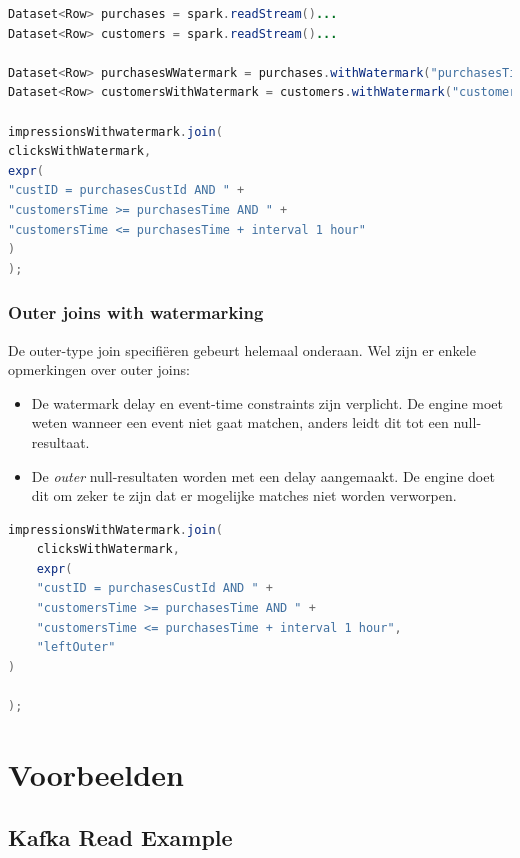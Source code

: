 \documentclass[a4paper,10pt,twoside]{report}
\begin{document}
\begin{lstlisting}[language=Java]
Dataset<Row> purchases = spark.readStream()...
Dataset<Row> customers = spark.readStream()...

Dataset<Row> purchasesWWatermark = purchases.withWatermark("purchasesTime","2 hours");
Dataset<Row> customersWithWatermark = customers.withWatermark("customersTime", "3 hours");

impressionsWithwatermark.join(
clicksWithWatermark,
expr(
"custID = purchasesCustId AND " +
"customersTime >= purchasesTime AND " +
"customersTime <= purchasesTime + interval 1 hour"
)
);
\end{lstlisting}

\subsubsection{Outer joins with watermarking}

De outer-type join specifiëren gebeurt helemaal onderaan. Wel zijn er enkele opmerkingen over outer joins:
\begin{itemize}
\item De watermark delay en event-time constraints zijn verplicht. De engine moet weten wanneer een event niet gaat matchen, anders leidt dit tot een null-resultaat.
\item De \textit{outer} null-resultaten worden met een delay aangemaakt. De engine doet dit om zeker te zijn dat er mogelijke matches niet worden verworpen.
\end{itemize}

\begin{lstlisting}[language=Java]
impressionsWithWatermark.join(
	clicksWithWatermark,
	expr(
	"custID = purchasesCustId AND " +
	"customersTime >= purchasesTime AND " +
	"customersTime <= purchasesTime + interval 1 hour",
	"leftOuter"
)

);
\end{lstlisting}

\section{Voorbeelden}

\subsection{Kafka Read Example}
\end{document}
